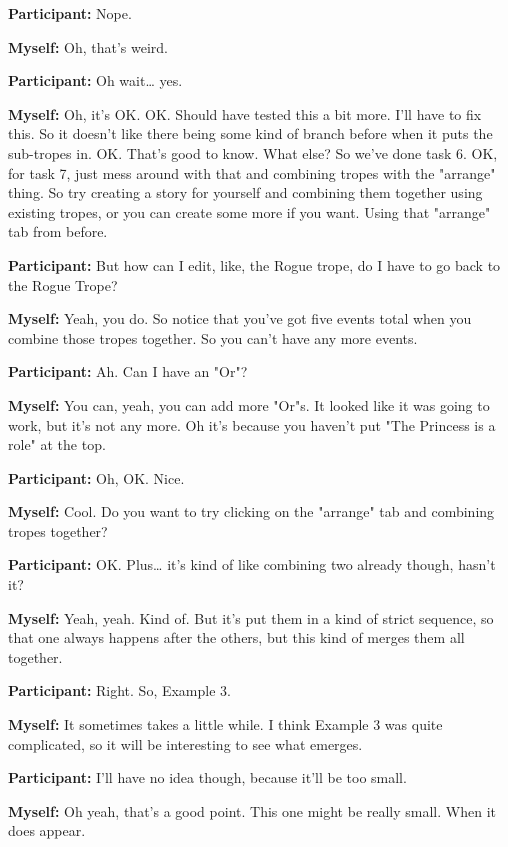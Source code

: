 \documentclass[11pt]{report}
\begin{document}
\begin{linenumbers}
\textbf{Participant:} Nope.

\textbf{Myself:} Oh, that's weird.

\textbf{Participant:} Oh wait\ldots{} yes.

\textbf{Myself:} Oh, it's OK. OK. Should have tested this a bit more. I'll have
to fix this. So it doesn't like there being some kind of branch before when it
puts the sub-tropes in. OK. That's good to know. What else? So we've done task
6. OK, for task 7, just mess around with that and combining tropes with the
"arrange" thing. So try creating a story for yourself and combining them
together using existing tropes, or you can create some more if you want. Using
that "arrange" tab from before.

\textbf{Participant:} But how can I edit, like, the Rogue trope, do I have to go back to the Rogue Trope?

\textbf{Myself:} Yeah, you do. So notice that you've got five events total when
you combine those tropes together. So you can't have any more events.

\textbf{Participant:} Ah. Can I have an "Or"?

\textbf{Myself:} You can, yeah, you can add more "Or"s. It looked like it was going to work, but it's not any more. Oh it's because you haven't put "The Princess is a role" at the top.

\textbf{Participant:} Oh, OK. Nice.

\textbf{Myself:} Cool. Do you want to try clicking on the "arrange" tab and combining tropes together?

\textbf{Participant:} OK. Plus\ldots{} it's kind of like combining two already though, hasn't it?

\textbf{Myself:} Yeah, yeah. Kind of. But it's put them in a kind of strict sequence, so that one always happens after the others, but this kind of merges them all together.

\textbf{Participant:} Right. So, Example 3.

\textbf{Myself:} It sometimes takes a little while. I think Example 3 was quite complicated, so it will be interesting to see what emerges.

\textbf{Participant:} I'll have no idea though, because it'll be too small.

\textbf{Myself:} Oh yeah, that's a good point. This one might be really small. When it does appear.


\end{linenumbers}
\end{document}
